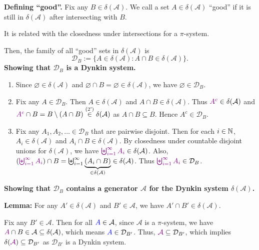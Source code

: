 \begin{enumerate}
\begin{pf}
\textbf{Defining ``good''.} Fix any \(B\in\delta(\mathcal{A})\). We call a set
\(A\in\delta(\mathcal{A})\) ``good'' if it is still in \(\delta(\mathcal{A})\)
after intersecting with \(B\). \begin{intuition}
It is related with the closedness under intersections for a \(\pi\)-system.
\end{intuition}
Then, the family of all ``good'' sets in \(\delta(\mathcal{A})\) is
\[
\mathcal{D}_{B}:=\{A\in\delta(\mathcal{A}):A\cap B\in\delta(\mathcal{A})\}.
\]
\textbf{Showing that \(\mathcal{D}_{B}\) is a Dynkin system.}
\begin{enumerate}[label={(\arabic*)}]
\item Since \(\varnothing\in\delta(\mathcal{A})\) and \(\varnothing\cap
B=\varnothing\in\delta(\mathcal{A})\), we have \(\varnothing\in\mathcal{D}_{B}\).
\item Fix any \(A\in\mathcal{D}_{B}\). Then \(A\in\delta(\mathcal{A})\) and
\(A\cap B\in\delta(\mathcal{A})\). Thus \({\color{violet}A^c}\in\delta(\mathcal{A})\) and
\({\color{violet}A^c}\cap B=B\setminus (A\cap B)\overset{\text{(2')}}{\in}\delta(\mathcal{A})\) as \(A\cap B\subseteq B\).
Hence \(A^c\in\mathcal{D}_{B}\).
\item Fix any \(A_1,A_2,\dotsc\in\mathcal{D}_{B}\) that are pairwise disjoint.
Then for each \(i\in\mathbb{N}\), \(A_i\in\delta(\mathcal{A})\) and \(A_i\cap B\in\delta(\mathcal{A})\).
By closedness under countable disjoint unions for \(\delta(\mathcal{A})\), we have
\({\color{violet}\biguplus_{i=1}^{\infty}A_i}\in\delta(\mathcal{A})\). Also,
\(({\color{violet}\biguplus_{i=1}^{\infty}A_i})\cap B
=\biguplus_{i=1}^{\infty}\underbrace{(A_i\cap B)}_{\in\delta(\mathcal{A})}
\in \delta(\mathcal{A})\). Thus \({\color{violet}\biguplus_{i=1}^{\infty}A_i}\in\mathcal{D}_{B}\).
\end{enumerate}
\textbf{Showing that \(\mathcal{D}_{B}\) contains a generator \(\mathcal{A}\) for the Dynkin system \(\delta(\mathcal{A})\).}

\textbf{Lemma:} For any \(A'\in\delta(\mathcal{A})\) and \(B'\in\mathcal{A}\), we have
\(A'\cap B'\in\delta(\mathcal{A})\).

\begin{pf}
Fix any \(B'\in\mathcal{A}\). Then for all \({\color{blue}A}\in\mathcal{A}\), since
\(\mathcal{A}\) is a \(\pi\)-system, we have \({\color{violet}A}\cap
B\in\mathcal{A}\subseteq \delta(\mathcal{A})\), which means
\({\color{blue}A}\in\mathcal{D}_{B'}\). Thus, \({\color{violet}\mathcal{A}}\subseteq
\mathcal{D}_{B'}\), which implies \(\delta({\color{violet}\mathcal{A}})\subseteq
\mathcal{D}_{B'}\) as \(\mathcal{D}_{B'}\) is a Dynkin system.


\end{pf}
\end{pf}
\end{enumerate}
